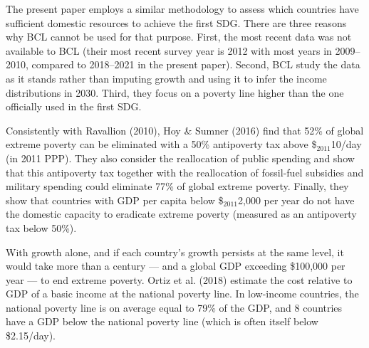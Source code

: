 The present paper employs a similar methodology to assess which countries have sufficient domestic resources to achieve the first SDG. There are three reasons why BCL cannot be used %
for that purpose. 
First, the most recent data was not available to BCL (their most recent survey year is 2012 with most years in 2009--2010, compared to 2018--2021 in the present paper). %
Second, BCL study the data as it stands rather than imputing growth and using it to infer the income distributions in 2030. Third, they focus on a poverty line higher than the one officially used in the first SDG.

Consistently with Ravallion (2010), Hoy \& Sumner (2016) find that 52\% of global extreme poverty can be eliminated with a 50\% antipoverty tax above \$$_\text{2011}$10/day (in 2011 PPP). They also consider the reallocation of public spending and show that this antipoverty tax together with the reallocation of fossil-fuel subsidies and military spending could eliminate 77\% of global extreme poverty. Finally, they show that countries with GDP per capita below \$$_\text{2011}$2,000 per year do not have the domestic capacity to eradicate extreme poverty (measured as an antipoverty tax below 50\%).\cite{hoy_gasoline_2016} 

With growth alone, and if each country's growth persists at the same level, it would take more than a century --- and a global GDP exceeding \$100,000 per year --- to end extreme poverty.\cite{woodward_incrementum_2015} %
Ortiz et al. (2018) estimate the cost relative to GDP of a basic income at the national poverty line. %
In low-income countries, the national poverty line is on average equal to 79\% of the GDP, and 8 countries have a GDP below the national poverty line (which is often itself below \$2.15/day).\cite{ortiz_universal_2018}

